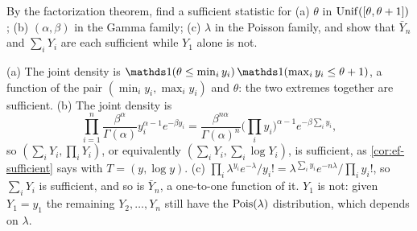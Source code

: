 \begin{exercise}
\label{ex:ef-sufficient-stats}
By the factorization theorem, find a sufficient statistic for (a) $\theta$ in $\mathrm{Unif}([\theta, \theta + 1])$; (b) $(\alpha, \beta)$ in the Gamma family; (c) $\lambda$ in the Poisson family, and show that $\bar{Y}_n$ and $\sum_i Y_i$ are each sufficient while $Y_1$ alone is not.
\end{exercise}
\begin{solution}
(a) The joint density is $\ind(\theta \leq \min_i y_i)\,\ind(\max_i y_i \leq \theta + 1)$, a function of the pair $(\min_i y_i, \max_i y_i)$ and $\theta$: the two extremes together are sufficient. (b) The joint density is
\[
\prod_{i=1}^n \frac{\beta^\alpha}{\Gamma(\alpha)}y_i^{\alpha - 1}e^{-\beta y_i} = \frac{\beta^{n\alpha}}{\Gamma(\alpha)^n}\Big(\prod_i y_i\Big)^{\alpha - 1}e^{-\beta\sum_i y_i},
\]
so $(\sum_i Y_i, \prod_i Y_i)$, or equivalently $(\sum_i Y_i, \sum_i\log Y_i)$, is sufficient, as \cref{cor:ef-sufficient} says with $T = (y, \log y)$. (c) $\prod_i \lambda^{y_i}e^{-\lambda}/y_i! = \lambda^{\sum_i y_i}e^{-n\lambda}/\prod_i y_i!$, so $\sum_i Y_i$ is sufficient, and so is $\bar{Y}_n$, a one-to-one function of it. $Y_1$ is not: given $Y_1 = y_1$ the remaining $Y_2, \ldots, Y_n$ still have the $\text{Pois}(\lambda)$ distribution, which depends on $\lambda$.
\end{solution}

